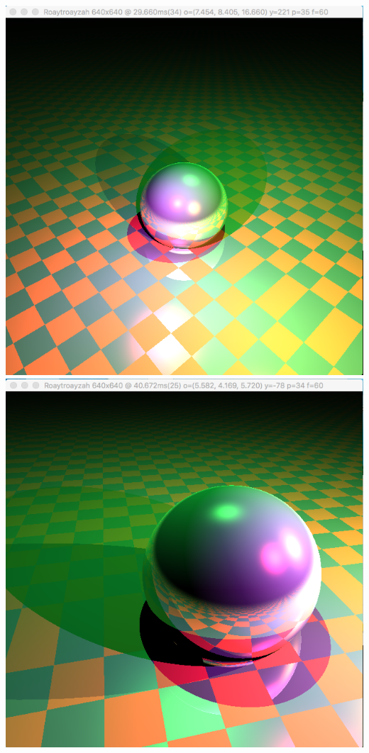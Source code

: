 \includegraphics[width=\textwidth]{img/colPointLights1sphere}
\includegraphics[width=\textwidth]{img/colPointlights1sphere_close}
